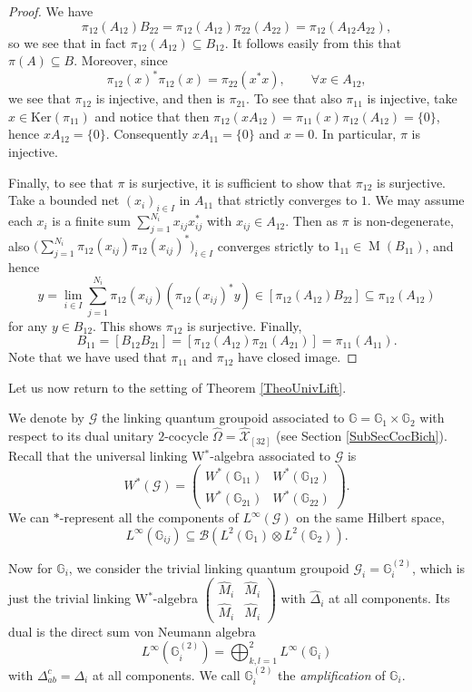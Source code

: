 \documentclass[reqno]{amsart}
\numberwithin{equation}{section}
\newcommand{\Ker}{\mathrm{Ker}}
\newcommand{\mcB}{\mathcal{B}}
\newcommand{\G}{\mathbb{G}}
\newcommand{\msG}{\mathscr{G}}
\newcommand{\mcX}{\mathcal{X}}
\newcommand{\wh}{\widehat}
\newcommand{\Mult}{\operatorname{M}}
\begin{document}
\begin{proof}
We have 
\[
\pi_{12}(A_{12})B_{22} = \pi_{12}(A_{12})\pi_{22}(A_{22}) = \pi_{12}(A_{12}A_{22}),
\]
so we see that in fact $\pi_{12}(A_{12}) \subseteq B_{12}$. It follows easily from this that $\pi(A) \subseteq B$. Moreover, since 
\[
\pi_{12}(x)^*\pi_{12}(x) = \pi_{22}(x^*x),\qquad \forall x\in A_{12},
\]
we see that $\pi_{12}$ is injective, and then is $\pi_{21}$. To see that also $\pi_{11}$ is injective, take $x\in \Ker(\pi_{11})$ and notice that then $\pi_{12}(xA_{12})=\pi_{11}(x)\pi_{12}(A_{12})=\{0\}$, hence $xA_{12} = \{0\}$. Consequently $xA_{11}=\{0\}$ and $x =0$. In particular, $\pi$ is injective. 

Finally, to see that $\pi$ is surjective, it is sufficient to show that $\pi_{12}$ is surjective. Take a bounded net $(x_i)_{i\in I}$ in $A_{11}$ that strictly converges to $1$. We may assume each $x_i$ is a finite sum $\sum_{j=1}^{N_i} x_{ij}x_{ij}^*$ with $x_{ij} \in A_{12}$. Then as $\pi$ is non-degenerate, also $\bigl(\sum_{j=1}^{N_i} \pi_{12}(x_{ij})\pi_{12}(x_{ij})^*\bigr)_{i\in I}$ converges strictly to $1_{11}\in \Mult(B_{11})$, and hence
\[
y  = \lim_{i\in I} \sum_{j=1}^{N_i} \pi_{12}(x_{ij}) (\pi_{12}(x_{ij})^*y) \in [\pi_{12}(A_{12})B_{22}] \subseteq \pi_{12}(A_{12})
\]
for any $y\in B_{12}$. This shows $\pi_{12}$ is surjective. Finally,
\[
B_{11}=[B_{12} B_{21}]=[\pi_{12}(A_{12})\pi_{21}(A_{21})]= \pi_{11}(A_{11}).
\]
Note that we have used that $\pi_{11}$ and $\pi_{12}$ have closed image. 
\end{proof}

Let us now return to the setting of Theorem \ref{TheoUnivLift}.

We denote by $\msG$ the linking quantum groupoid associated to $\G = \G_1\times \G_2$ with respect to its dual unitary $2$-cocycle $\hat{\Omega} = \wh{\mcX}_{[32]}$ (see Section \ref{SubSecCocBich}). Recall that the universal linking W$^*$-algebra associated to $\msG$ is
\[
W^*(\msG) = \begin{pmatrix} W^*(\G_{11}) & W^*(\G_{12}) \\
W^*(\G_{21}) & W^*(\G_{22})\end{pmatrix}.
\]
We can $*$-represent all the components of $L^{\infty}(\msG)$ on the same Hilbert space, 
\[
L^{\infty}(\G_{ij}) \subseteq \mcB(L^2(\G_1)\otimes L^2(\G_2)). 
\]

Now for $\G_i$, we consider the trivial linking quantum groupoid $\msG_i = \G_i^{(2)}$, which is just the trivial linking W$^*$-algebra $\begin{pmatrix} \hat{M}_i & \hat{M}_i\\ \hat{M}_i& \hat{M}_i\end{pmatrix}$ with $\hat{\Delta}_i$ at all components. Its dual is the direct sum von Neumann algebra
\[
L^{\infty}(\G_i^{(2)}) = \bigoplus_{k,l=1}^2 L^{\infty}(\G_i)
\]
with $\Delta_{ab}^c = \Delta_i$ at all components. We call $\G_i^{(2)}$ the \emph{amplification} of $\G_i$. 
\end{document}
